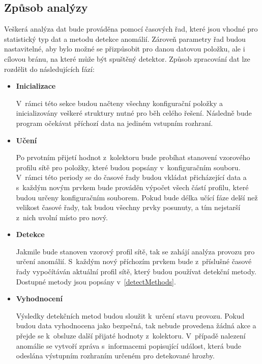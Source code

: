  
 \subsection{Způsob analýzy}
 Veškerá analýza dat bude prováděna pomocí časových řad, které jsou vhodné pro statistický typ 
 dat a metodu detekce anomálií. Zároveň parametry řad budou nastavitelné, aby bylo možné se přizpůsobit
 pro danou datovou položku, ale i cílovou bránu, na které může být spuštěný detektor. Způsob 
 zpracování dat lze rozdělit do následujících fází:
  \begin{itemize}
   \item \textbf{Inicializace}
   
   V~rámci této sekce budou načteny všechny konfigurační položky a inicializovány veškeré struktury
   nutné pro běh celého řešení. Následně bude program očekávat příchozí data na jediném vstupním
   rozhraní.
   
   \item \textbf{Učení}
   
   Po prvotním přijetí hodnot z~kolektoru bude probíhat stanovení vzorového profilu sítě pro položky,
   které budou popsány v~konfiguračním souboru. V~rámci
   této periody se do časové řady budou vkládat přicházející data a s~každým novým prvkem 
   bude prováděn výpočet všech částí profilu, které budou určeny konfiguračním souborem.
   Pokud bude délka učící fáze delší než velikost 
   časové řady, tak budou všechny prvky posunuty, a tím nejstarší z~nich uvolní místo pro nový.
    \newpage
   \item \textbf{Detekce}
   
   Jakmile bude stanoven vzorový profil sítě, tak se zahájí analýza provozu pro určení anomálií.
   S~každým nový příchozím prvkem bude z~příslušné časové řady vypočítáván aktuální profil sítě,
   který budou používat detekční metody. Dostupné metody jsou popsány v~\ref{detectMethods}.
   
  
   \item \textbf{Vyhodnocení}
   
   Výsledky detekčních metod budou sloužit k~určení stavu provozu. Pokud budou data vyhodnocena jako
   bezpečná, tak nebude provedena žádná akce a přejde se k~obsluze další přijaté hodnoty z~kolektoru.
   V~případě nalezení anomálie se vytvoří zpráva s~informacemi popisující událost, která bude 
   odeslána výstupním rozhraním určeném pro detekované hrozby.   
  \end{itemize}
  
  \newpage
